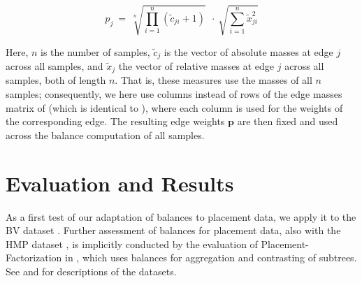 \begin{equation}
    \label{ch:Balances:sec:Methods:eq:EdgeWeights}
    p_j ~=~ \sqrt[n]{ \prod_{i=1}^{n} ( \tilde{c}_{ji} + 1 ) }  ~~\cdot~  \sqrt{ \sum_{i=1}^{n} \tilde{x}_{ji}^2 }
\end{equation}

Here, $n$ is the number of samples, $\tilde{c}_j$ is the vector of absolute masses at edge $j$ across all samples,
and $\tilde{x}_j$ the vector of relative masses at edge $j$ across all samples, both of length $n$.
That is, these measures use the masses of all $n$ samples;
consequently, we here use columns instead of rows of the edge masses matrix of 
(which is identical to ),
where each column is used for the weights of the corresponding edge.
The resulting edge weights $\bm{p}$ are then fixed and used across the balance computation of all samples.



\section{Evaluation and Results}
\label{ch:Balances:sec:Results}

As a first test of our adaptation of balances to placement data, we apply it to the \ac{BV} dataset \cite{Srinivasan2012}.
Further assessment of balances for placement data, also with the \ac{HMP} dataset \cite{Huttenhower2012,Methe2012},
is implicitly conducted by the evaluation of Placement-Factorization in ,
which uses balances for aggregation and contrasting of subtrees.
See  and 
for descriptions of the datasets.


